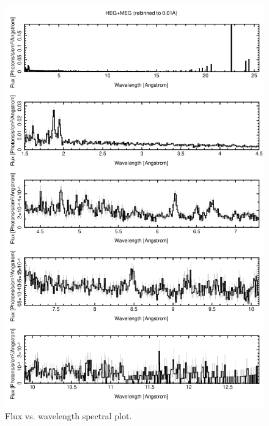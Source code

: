 \begin{figure}[ht!]
\begin{minipage}[t]{0.6\textwidth}
        \includegraphics[scale = 0.35]{Chapters/Figures/spf.png}
        \caption{Flux vs. wavelength spectral plot.}
        \label{spf}
    \end{minipage}
\end{figure}




